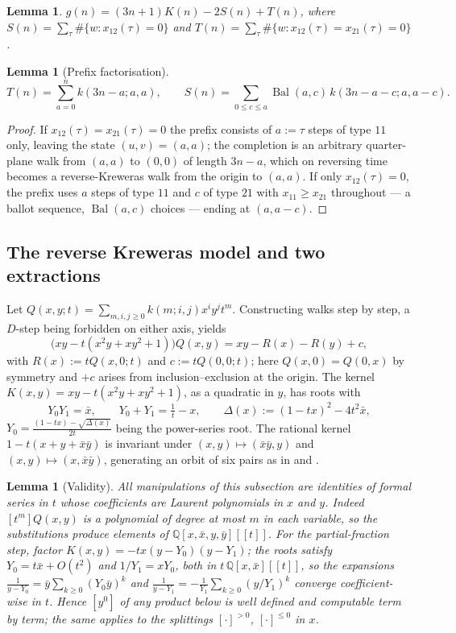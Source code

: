 \documentclass[11pt]{article}
\newtheorem{lemma}[theorem]{Lemma}
\theoremstyle{definition}
\newcommand{\bx}{\bar x}\newcommand{\by}{\bar y}
\newcommand{\Bal}{\operatorname{Bal}}
\begin{document}
\begin{lemma}\label{lem:cc}
$g(n)=(3n+1)K(n)-2S(n)+T(n)$, where
$S(n)=\sum_\tau\#\{w:x_{12}(\tau)=0\}$ and
$T(n)=\sum_\tau\#\{w:x_{12}(\tau)=x_{21}(\tau)=0\}$.
\end{lemma}

\begin{lemma}[Prefix factorisation]\label{lem:pf}
\[
  T(n)=\sum_{a=0}^{n}k(3n-a;a,a),\qquad
  S(n)=\sum_{0\le c\le a}\Bal(a,c)\,k(3n-a-c;a,a-c).
\]
\end{lemma}

\begin{proof}
If $x_{12}(\tau)=x_{21}(\tau)=0$ the prefix consists of $a:=\tau$ steps of type
$11$ only, leaving the state $(u,v)=(a,a)$; the completion is an arbitrary
quarter-plane walk from $(a,a)$ to $(0,0)$ of length $3n-a$, which on reversing
time becomes a reverse-Kreweras walk from the origin to $(a,a)$. If only
$x_{12}(\tau)=0$, the prefix uses $a$ steps of type $11$ and $c$ of type $21$
with $x_{11}\ge x_{21}$ throughout --- a ballot sequence, $\Bal(a,c)$ choices
--- ending at $(a,a-c)$.
\end{proof}

\subsection{The reverse Kreweras model and two extractions}

Let $Q(x,y;t)=\sum_{m,i,j\ge0}k(m;i,j)x^{i}y^{j}t^{m}$. Constructing walks step
by step, a $D$-step being forbidden on either axis, yields
\begin{equation}\label{eq:FE}
  \bigl(xy-t(x^{2}y+xy^{2}+1)\bigr)Q(x,y)=xy-R(x)-R(y)+c,
\end{equation}
with $R(x):=tQ(x,0;t)$ and $c:=tQ(0,0;t)$; here $Q(x,0)=Q(0,x)$ by symmetry and
$+c$ arises from inclusion--exclusion at the origin. The kernel
$K(x,y)=xy-t(x^{2}y+xy^{2}+1)$, as a quadratic in $y$, has roots with
\[
  Y_0Y_1=\bx,\qquad Y_0+Y_1=\tfrac1t-x,\qquad
  \Delta(x):=(1-tx)^{2}-4t^{2}\bx,
\]
$Y_0=\frac{(1-tx)-\sqrt{\Delta(x)}}{2t}$ being the power-series root. The
rational kernel $1-t(x+y+\bx\by)$ is invariant under
$(x,y)\mapsto(\bx\by,y)$ and $(x,y)\mapsto(x,\bx\by)$, generating an orbit of
six pairs as in \cite[\S2.3]{BM05} and \cite[\S2.3]{Mishna}.

\begin{lemma}[Validity]\label{lem:valid}
All manipulations of this subsection are identities of formal series in $t$
whose coefficients are Laurent polynomials in $x$ and $y$. Indeed
$[t^{m}]Q(x,y)$ is a polynomial of degree at most $m$ in each variable, so the
substitutions produce elements of $\mathbb{Q}[x,\bx,y,\by][[t]]$. For the
partial-fraction step, factor $K(x,y)=-tx(y-Y_0)(y-Y_1)$; the roots satisfy
$Y_0=t\bx+O(t^{2})$ and $1/Y_1=xY_0$, both in
$t\,\mathbb{Q}[x,\bx][[t]]$, so the expansions
$\frac{1}{y-Y_0}=\by\sum_{k\ge0}(Y_0\by)^{k}$ and
$\frac{1}{y-Y_1}=-\frac1{Y_1}\sum_{k\ge0}(y/Y_1)^{k}$ converge coefficient-wise
in $t$. Hence $[y^{0}]$ of any product below is well defined and computable
term by term; the same applies to the splittings $[\cdot]^{>0}$,
$[\cdot]^{\le0}$ in $x$.
\end{lemma}
\end{document}
